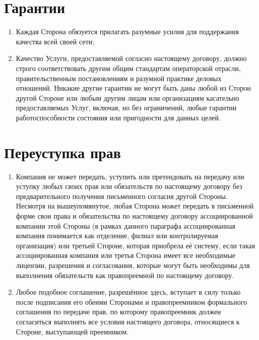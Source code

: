 \begin{Form}
    \section{Гарантии}\label{sec:11}
        \begin{enumerate}[label=\thesection.\arabic*.]
         \item Каждая Сторона  обязуется прилагать разумные усилия  для поддержания качества всей своей сети;
         \item Качество Услуги, предоставляемой согласно настоящему договору, должно строго соответствовать другим общим
               стандартам операторской отрасли, правительственным постановлениям и разумной практике деловых отношений. Никакие
               другие гарантии не могут быть даны любой из Сторон  другой Стороне  или любым другим лицам или организациям
               касательно предоставляемых Услуг, включая, но без ограничений, любые гарантии работоспособности состояния или
               пригодности для данных целей.
        \end{enumerate}

    \section{Переуступка прав}
        \begin{enumerate}[label=\thesection.\arabic*.]
         \item Компания  не может передать, уступить или претендовать на передачу или уступку любых своих прав или обязательств
               по настоящему договору без предварительного получения письменного согласия другой Стороны. Несмотря на
               вышеупомянутое, любая Сторона  может передать в письменной форме свои права и обязательства по настоящему
               договору ассоциированной компании этой Стороны (в рамках данного параграфа ассоциированная компания понимается
               как отделение, филиал или контролируемая организация) или третьей Стороне, которая приобрела её систему,
               если такая ассоциированная компания или третья Сторона  имеет все необходимые
               лицензии, разрешения и согласования, которые могут быть необходимы для выполнения обязательств как правопреемной по
               настоящему договору.
         \item Любое подобное соглашение, разрешённое здесь, вступает в силу только после подписания его
               обеими Сторонами  и правопреемником формального соглашения по передаче прав, по которому правопреемник должен
               согласиться выполнять все условия настоящего договора, относящиеся к Стороне, выступающей преемником.
        \end{enumerate}
        


\end{Form}
